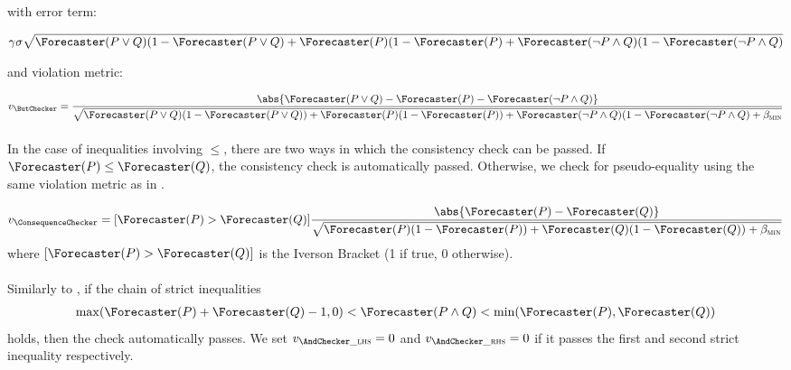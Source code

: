 with error term:

\begin{align*}
    \gamma \sigma \sqrt{\Forecaster(P \lor Q)(1 - \Forecaster(P \lor Q) + \Forecaster(P)(1 - \Forecaster(P) + \Forecaster(\lnot P \land Q)(1 - \Forecaster(\lnot P \land Q)}
\end{align*}

and violation metric:

\begin{align*}
    v_{\ButChecker}
    = \frac{\abs{\Forecaster(P \lor Q) - \Forecaster(P) - \Forecaster(\lnot P \land Q)}}{
        \sqrt{\Forecaster(P \lor Q)(1 - \Forecaster(P \lor Q)) + \Forecaster(P)(1 - \Forecaster(P)) + \Forecaster(\lnot P \land Q)(1 - \Forecaster(\lnot P \land Q)+ \betamin}
    }
\end{align*}


\paragraph{\ConsequenceChecker}

In the case of inequalities involving $\le$, there are two ways in which the consistency check can be passed.
If $\Forecaster(P) \le \Forecaster(Q)$, the consistency check is automatically passed.
Otherwise,
we check for pseudo-equality using the same violation metric as in \ParaphraseChecker.

\begin{align*}
    v_{\ConsequenceChecker}
    = [\Forecaster(P) > \Forecaster(Q)] \frac{\abs{\Forecaster(P) - \Forecaster(Q)}}{
        \sqrt{\Forecaster(P)(1 - \Forecaster(P)) + \Forecaster(Q)(1 - \Forecaster(Q))+ \betamin}
    }
\end{align*}
where $[\Forecaster(P) > \Forecaster(Q)]$ is the Iverson Bracket (1 if true, 0 otherwise).



\paragraph{\AndChecker}


Similarly to \ConsequenceChecker, if the chain of strict inequalities
\begin{align*}
    \max(\Forecaster(P) + \Forecaster(Q) - 1, 0) < \Forecaster(P \land Q) < \min(\Forecaster(P), \Forecaster(Q))
\end{align*}
holds, then the check automatically passes.  We set $v_{\AndChecker\_\textsc{lhs}} = 0$ and $v_{\AndChecker\_\textsc{rhs}} = 0$ if it passes the first and second strict inequality respectively.

